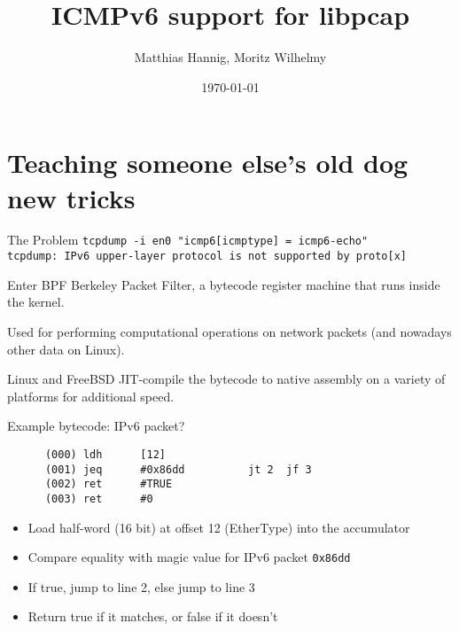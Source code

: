 \documentclass{beamer}
\title{ICMPv6 support for libpcap}
\date{\today}
\author{Matthias Hannig, Moritz Wilhelmy}
\institute{RIPE NCC IPv6 Hackathon Copenhagen}
\begin{document}
  \maketitle
  \section{Teaching someone else's old dog new tricks}
  \begin{frame}{The Problem}
    \texttt{tcpdump -i en0 "icmp6[icmptype] = icmp6-echo"}\\
    \texttt{tcpdump: IPv6 upper-layer protocol is not supported by proto[x]}
  \end{frame}

  \begin{frame}{Enter BPF}
    Berkeley Packet Filter, a bytecode register machine that runs inside the kernel.

    Used for performing computational operations on network packets (and nowadays other data on Linux).

    Linux and FreeBSD JIT-compile the bytecode to native assembly on a variety
    of platforms for additional speed.
  \end{frame}

  \begin{frame}[fragile]{Example bytecode: IPv6 packet?}
    \begin{verbatim}
      (000) ldh      [12]
      (001) jeq      #0x86dd          jt 2	jf 3
      (002) ret      #TRUE
      (003) ret      #0
    \end{verbatim}

    \begin{itemize}
      \item Load half-word (16 bit) at offset 12 (EtherType) into the accumulator
      \item Compare equality with magic value for IPv6 packet \texttt{0x86dd}
      \item If true, jump to line 2, else jump to line 3
      \item Return true if it matches, or false if it doesn't
    \end{itemize}
  \end{frame}
\end{document}
